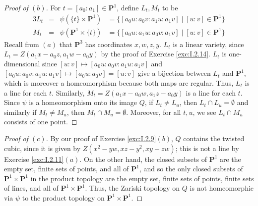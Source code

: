 \documentclass[10pt]{article}
\theoremstyle{definition}
\theoremstyle{remark}
\numberwithin{equation}{section}
\numberwithin{figure}{subsubsection}
\newcommand{\PP}{\mathbf{P}}
\begin{document}
\begin{proof}[Proof of $(b)$]
  For $t = [a_0:a_1] \in \PP^1$, define $L_t,M_t$ to be
  \begin{alignat*}{3}
    L_t &={}& \psi(\{t\} \times \PP^1) &= \{[a_0u : a_0v : a_1u : a_1v] \mid [u:v]
    \in \PP^1\}\\
    M_t &={}& \psi(\PP^1 \times \{t\}) &= \{[a_0u : a_1u : a_0v : a_1v] \mid [u:v]
    \in \PP^1\}
  \end{alignat*}
  Recall from $(a)$ that $\PP^3$ has coordinates $x,w,z,y$.
  $L_t$ is a linear variety, since $L_t = Z(a_1x - a_0z,a_1w - a_0y)$ by the
  proof of Exercise \ref{exc:I.2.14}. $L_t$ is one-dimensional since
  $[u:v] \mapsto [a_0u : a_0v : a_1u : a_1v]$ and 
  $[a_0u : a_0v : a_1u : a_1v] \mapsto [a_0u :a_0v] = [u:v]$ give a
  bijection between $L_t$ and $\PP^1$, which is moreover a homeomorphism because
  both maps are regular. Thus, $L_t$ is a line for each $t$.
  Similarly, $M_t = Z(a_1x - a_0w,a_1z - a_0y)$ is a line for each $t$.
  Since $\psi$ is a homeomorphism onto its image $Q$, if $L_t \ne L_u$, then
  $L_t \cap L_u = \emptyset$ and similarly if $M_t \ne M_u$, then $M_t \cap M_u =
  \emptyset$. Moreover, for all $t,u$, we see $L_t \cap M_u$ consists of one point.
\end{proof}
\begin{proof}[Proof of $(c)$]
  By our proof of Exercise \ref{exc:I.2.9}$(b)$, $Q$ contains the twisted cubic,
  since it is given by $Z(x^2-yw,xz-y^2,xy-zw)$; this is not a line by Exercise
  \ref{exc:I.2.11}$(a)$. On the
  other hand, the closed subsets of $\PP^1$ are the empty set, finite sets of
  points, and all of $\PP^1$, and so the only closed subsets of $\PP^1 \times
  \PP^1$ in the product topology are the empty set, finite sets of points,
  finite sets of lines, and all of $\PP^1 \times \PP^1$. Thus, the Zariski
  topology on $Q$ is not homeomorphic via $\psi$ to the product topology on
  $\PP^1 \times \PP^1$.
\end{proof}
\end{document}
